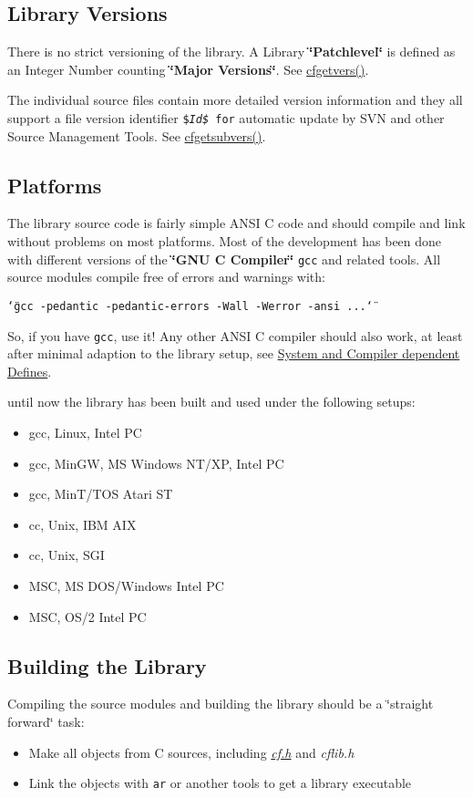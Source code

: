 \hypertarget{development_versions}{}\subsection{Library Versions}\label{development_versions}
There is no strict versioning of the library. A Library {\bf \char`\"{}Patchlevel\char`\"{}} is defined as an Integer Number counting {\bf \char`\"{}Major Versions\char`\"{}}. See \hyperlink{group__retrieval_gc4e376e3630e9b25655ee0e0b1a54a5b}{cfgetvers()}.

The individual source files contain more detailed version information and they all support a file version identifier {\tt \${\em Id\$\/} for} automatic update by SVN and other Source Management Tools. See \hyperlink{group__retrieval_gbd4ca2adbcac9eef4d1363424e440662}{cfgetsubvers()}.\hypertarget{development_platforms}{}\subsection{Platforms}\label{development_platforms}
The library source code is fairly simple ANSI C code and should compile and link without problems on most platforms. Most of the development has been done with different versions of the {\bf \char`\"{}GNU C Compiler\char`\"{}} {\tt gcc} and related tools. All source modules compile free of errors and warnings with:

{\tt \char`\"{}gcc -pedantic -pedantic-errors -Wall -Werror -ansi ...\char`\"{}} 

So, if you have {\tt gcc}, use it! Any other ANSI C compiler should also work, at least after minimal adaption to the library setup, see \hyperlink{development_compilation_options}{System and Compiler dependent Defines}.

until now the library has been built and used under the following setups:

\begin{itemize}
\item gcc, Linux, Intel PC\item gcc, MinGW, MS Windows NT/XP, Intel PC\item gcc, MinT/TOS Atari ST\item cc, Unix, IBM AIX\item cc, Unix, SGI\item MSC, MS DOS/Windows Intel PC\item MSC, OS/2 Intel PC\end{itemize}
\hypertarget{development_library_building}{}\subsection{Building the Library}\label{development_library_building}
Compiling the source modules and building the library should be a \char`\"{}straight forward\char`\"{} task:\begin{itemize}
\item Make all objects from C sources, including {\em \hyperlink{cf_8h}{cf.h}\/} and {\em cflib.h\/} \item Link the objects with {\tt ar} or another tools to get a library executable\end{itemize}


